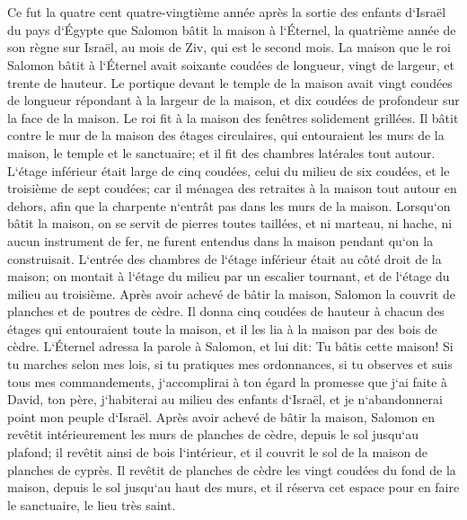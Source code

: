 \chapter{}

\verse Ce fut la quatre cent quatre-vingtième année après la sortie des enfants d`Israël du pays d`Égypte que Salomon bâtit la maison à l`Éternel, la quatrième année de son règne sur Israël, au mois de Ziv, qui est le second mois. 
\verse La maison que le roi Salomon bâtit à l`Éternel avait soixante coudées de longueur, vingt de largeur, et trente de hauteur. 
\verse Le portique devant le temple de la maison avait vingt coudées de longueur répondant à la largeur de la maison, et dix coudées de profondeur sur la face de la maison. 
\verse Le roi fit à la maison des fenêtres solidement grillées. 
\verse Il bâtit contre le mur de la maison des étages circulaires, qui entouraient les murs de la maison, le temple et le sanctuaire; et il fit des chambres latérales tout autour. 
\verse L`étage inférieur était large de cinq coudées, celui du milieu de six coudées, et le troisième de sept coudées; car il ménagea des retraites à la maison tout autour en dehors, afin que la charpente n`entrât pas dans les murs de la maison. 
\verse Lorsqu`on bâtit la maison, on se servit de pierres toutes taillées, et ni marteau, ni hache, ni aucun instrument de fer, ne furent entendus dans la maison pendant qu`on la construisait. 
\verse L`entrée des chambres de l`étage inférieur était au côté droit de la maison; on montait à l`étage du milieu par un escalier tournant, et de l`étage du milieu au troisième. 
\verse Après avoir achevé de bâtir la maison, Salomon la couvrit de planches et de poutres de cèdre. 
\verse Il donna cinq coudées de hauteur à chacun des étages qui entouraient toute la maison, et il les lia à la maison par des bois de cèdre. 
\verse L`Éternel adressa la parole à Salomon, et lui dit: Tu bâtis cette maison! 
\verse Si tu marches selon mes lois, si tu pratiques mes ordonnances, si tu observes et suis tous mes commandements, j`accomplirai à ton égard la promesse que j`ai faite à David, ton père, 
\verse j`habiterai au milieu des enfants d`Israël, et je n`abandonnerai point mon peuple d`Israël. 
\verse Après avoir achevé de bâtir la maison, 
\verse Salomon en revêtit intérieurement les murs de planches de cèdre, depuis le sol jusqu`au plafond; il revêtit ainsi de bois l`intérieur, et il couvrit le sol de la maison de planches de cyprès. 
\verse Il revêtit de planches de cèdre les vingt coudées du fond de la maison, depuis le sol jusqu`au haut des murs, et il réserva cet espace pour en faire le sanctuaire, le lieu très saint. 
